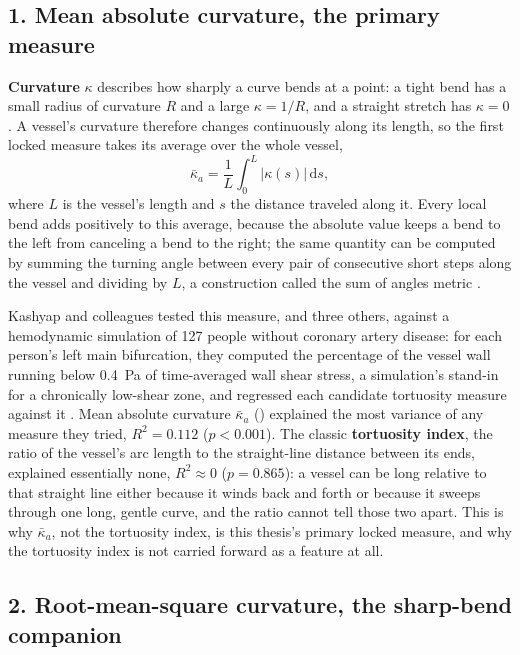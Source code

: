 \subsection*{1. Mean absolute curvature, the primary measure}

\textbf{Curvature} $\kappa$ describes how sharply a curve bends at a point: a tight bend has a small
radius of curvature $R$ and a large $\kappa = 1/R$, and a straight stretch has $\kappa = 0$. A
vessel's curvature therefore changes continuously along its length, so the first locked measure
takes its average over the whole vessel,
\begin{equation}
  \bar\kappa_a = \frac{1}{L}\int_0^L \lvert\kappa(s)\rvert\,\mathrm{d}s ,
  \label{eq:kappa-a}
\end{equation}
where $L$ is the vessel's length and $s$ the distance traveled along it. Every local bend adds
positively to this average, because the absolute value keeps a bend to the left from canceling a
bend to the right; the same quantity can be computed by summing the turning angle between every pair
of consecutive short steps along the vessel and dividing by $L$, a construction called the sum of
angles metric \cite{bullitt2003tortuosity}.

Kashyap and colleagues tested this measure, and three others, against a hemodynamic simulation of
127 people without coronary artery disease: for each person's left main bifurcation, they computed
the percentage of the vessel wall running below 0.4~Pa of time-averaged wall shear stress, a
simulation's stand-in for a chronically low-shear zone, and regressed each candidate tortuosity
measure against it \cite{kashyap2022tortuosity}. Mean absolute curvature $\bar\kappa_a$
() explained the most variance of any measure they tried, $R^2 = 0.112$
($p < 0.001$). The classic \textbf{tortuosity index}, the ratio of the vessel's arc length to the
straight-line distance between its ends, explained essentially none, $R^2 \approx 0$
($p = 0.865$): a vessel can be long relative to that straight line either because it winds back and
forth or because it sweeps through one long, gentle curve, and the ratio cannot tell those two
apart. This is why $\bar\kappa_a$, not the tortuosity index, is this thesis's primary locked
measure, and why the tortuosity index is not carried forward as a feature at all.

\subsection*{2. Root-mean-square curvature, the sharp-bend companion}

